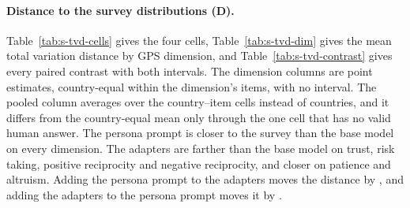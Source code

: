 \documentclass[12pt]{article}
\begin{document}
\paragraph{Distance to the survey distributions (D).} Table~\ref{tab:s-tvd-cells} gives the four cells, Table~\ref{tab:s-tvd-dim} gives the mean total variation distance by GPS dimension, and Table~\ref{tab:s-tvd-contrast} gives every paired contrast with both intervals. The dimension columns are point estimates, country-equal within the dimension's items, with no interval. The pooled column averages over the country--item cells instead of countries, and it differs from the country-equal mean only through the one cell that has no valid human answer. The persona prompt is closer to the survey than the base model on every dimension. The adapters are farther than the base model on trust, risk taking, positive reciprocity and negative reciprocity, and closer on patience and altruism. Adding the persona prompt to the adapters moves the distance by  , and adding the adapters to the persona prompt moves it by  .
\end{document}
